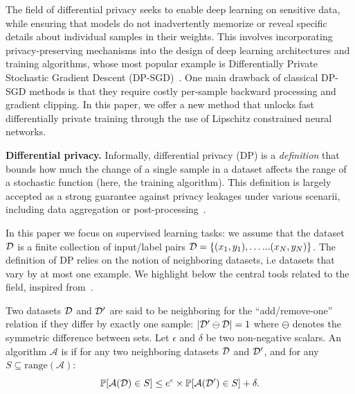 The field of differential privacy seeks to enable deep learning on sensitive data, while ensuring that models do not inadvertently memorize or reveal specific details about individual samples in their weights. This involves incorporating privacy-preserving mechanisms into the design of deep learning architectures and training algorithms, whose most popular example is Differentially Private Stochastic Gradient Descent (DP-SGD)~\citep{abadi2016deep}. One main drawback of classical DP-SGD methods is that they require costly per-sample backward processing and gradient clipping.  In this paper, we offer a new method that unlocks fast differentially private training through the use of Lipschitz constrained neural networks. 

\textbf{Differential privacy.}
    Informally, differential privacy (DP) is a \emph{definition} that bounds how much the change of a single sample in a dataset affects the range of a stochastic function (here, the training algorithm). This definition is largely accepted as a strong guarantee against privacy leakages under various scenarii, including data aggregation or post-processing~\citep{dwork2006calibrating}.  

    In this paper we focus on supervised learning tasks: we assume that the dataset $\mathcal{D}$ is a finite collection of input/label pairs $\mathcal{D}=\{(x_1,y_1),\ldots... (x_N,y_N)\}$.  
    The definition of DP relies on the notion of neighboring datasets, i.e datasets that vary by at most one example.
    We highlight below the central tools related to the field, inspired from~\cite{dwork2014algorithmic}.
    
    \begin{definition}\label{def:dp}
        Two datasets $\mathcal{D}$ and $\mathcal{D}'$ are said to be neighboring for the ``add/remove-one'' relation if they differ by exactly one sample: $|\mathcal{D}'\ominus\mathcal{D}|=1$ where $\ominus$ denotes the symmetric difference between sets. Let $\epsilon$ and $\delta$ be two non-negative scalars. An algorithm $\mathcal{A}$ is \DP if for any two neighboring datasets $\mathcal{D}$ and $\mathcal{D}'$, and for any $S \subseteq \text{range}(\mathcal{A})$:
        \begin{equation}\mathbb{P}[\mathcal{A}(\mathcal{D}) \in S] \leq e^{\epsilon} \times \mathbb{P}[\mathcal{A}(\mathcal{D}') \in S] + \delta.
        \end{equation}
    \end{definition}
    
